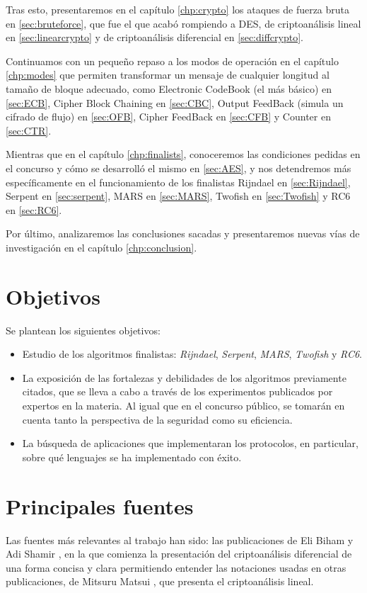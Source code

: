 Tras esto, presentaremos en el capítulo \ref{chp:crypto} los ataques de fuerza bruta en \ref{sec:bruteforce}, que fue el que acabó rompiendo a DES, de criptoanálisis lineal en \ref{sec:linearcrypto} y de criptoanálisis diferencial en \ref{sec:diffcrypto}.

Continuamos con un pequeño repaso a los modos de operación en el capítulo \ref{chp:modes} que permiten transformar un mensaje de cualquier longitud al tamaño de bloque adecuado, como Electronic CodeBook (el más básico) en \ref{sec:ECB}, Cipher Block Chaining en \ref{sec:CBC}, Output FeedBack (simula un cifrado de flujo) en \ref{sec:OFB}, Cipher FeedBack en \ref{sec:CFB} y Counter en \ref{sec:CTR}.

Mientras que en el capítulo \ref{chp:finalists}, conoceremos las condiciones pedidas en el concurso y cómo se desarrolló el mismo en \ref{sec:AES}, y nos detendremos más específicamente en el funcionamiento de los finalistas Rijndael en \ref{sec:Rijndael}, Serpent en \ref{sec:serpent}, MARS en \ref{sec:MARS}, Twofish en \ref{sec:Twofish} y RC6 en \ref{sec:RC6}.
 
Por último, analizaremos las conclusiones sacadas y presentaremos nuevas vías de investigación en el capítulo \ref{chp:conclusion}.

\section{Objetivos}
Se plantean los siguientes objetivos:
\begin{itemize}
	\item Estudio de los algoritmos finalistas: \textit{Rijndael}, \textit{Serpent}, \textit{MARS}, \textit{Twofish} y \textit{RC6}.
	
	\item La exposición de las fortalezas y debilidades de los algoritmos previamente citados, que se lleva a cabo a través de los experimentos publicados por expertos en la materia. Al igual que en el concurso público, se tomarán en cuenta tanto la perspectiva de la seguridad como su eficiencia.
	
	\item La búsqueda de aplicaciones que implementaran los protocolos, en particular, sobre qué lenguajes se ha implementado con éxito.
\end{itemize}

\section{Principales fuentes}
Las fuentes más relevantes al trabajo han sido:
las publicaciones de Eli Biham y Adi Shamir \cite{DES_Diff}, en la que comienza la presentación del criptoanálisis diferencial de una forma concisa y clara permitiendo entender las notaciones usadas en otras publicaciones, de Mitsuru Matsui \cite{DES_Lin}, que presenta el criptoanálisis lineal.

